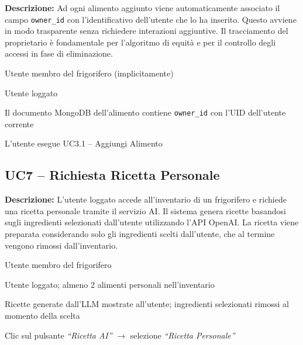 \documentclass[12pt,a4paper,twoside]{report}
\newenvironment{ucbox}{%
  \begin{mdframed}[
    backgroundcolor=ucbg,
    linecolor=ucborder,
    linewidth=1pt,
    innerleftmargin=10pt,
    innerrightmargin=10pt,
    innertopmargin=8pt,
    innerbottommargin=8pt,
    roundcorner=4pt
  ]
}{%
  \end{mdframed}
}
\begin{document}
\begin{ucbox}
\textbf{Descrizione:} Ad ogni alimento aggiunto viene automaticamente associato il campo \texttt{owner\_id} con l'identificativo dell'utente che lo ha inserito. Questo avviene in modo trasparente senza richiedere interazioni aggiuntive. Il tracciamento del proprietario è fondamentale per l'algoritmo di equità e per il controllo degli accessi in fase di eliminazione.

\begin{description}[leftmargin=4cm, style=sameline]
  \item[Attori Coinvolti:] Utente membro del frigorifero (implicitamente)
  \item[Precondizione:] Utente loggato
  \item[Postcondizione:] Il documento MongoDB dell'alimento contiene \texttt{owner\_id} con l'UID dell'utente corrente
  \item[Trigger:] L'utente esegue UC3.1 -- Aggiungi Alimento
\end{description}
\end{ucbox}

\newpage
\subsection{UC7 -- Richiesta Ricetta Personale}

\begin{ucbox}
\textbf{Descrizione:} L'utente loggato accede all'inventario di un frigorifero e richiede una ricetta personale tramite il servizio AI. Il sistema genera ricette basandosi sugli ingredienti selezionati dall'utente utilizzando l'API OpenAI. La ricetta viene preparata considerando solo gli ingredienti scelti dall'utente, che al termine vengono rimossi dall'inventario.

\begin{description}[leftmargin=4cm, style=sameline]
  \item[Attori Coinvolti:] Utente membro del frigorifero
  \item[Precondizione:] Utente loggato; almeno 2 alimenti personali nell'inventario
  \item[Postcondizione:] Ricette generate dall'LLM mostrate all'utente; ingredienti selezionati rimossi al momento della scelta
  \item[Trigger:] Clic sul pulsante \textit{``Ricetta AI''} $\to$ selezione \textit{``Ricetta Personale''}
\end{description}
\end{ucbox}
\end{document}
